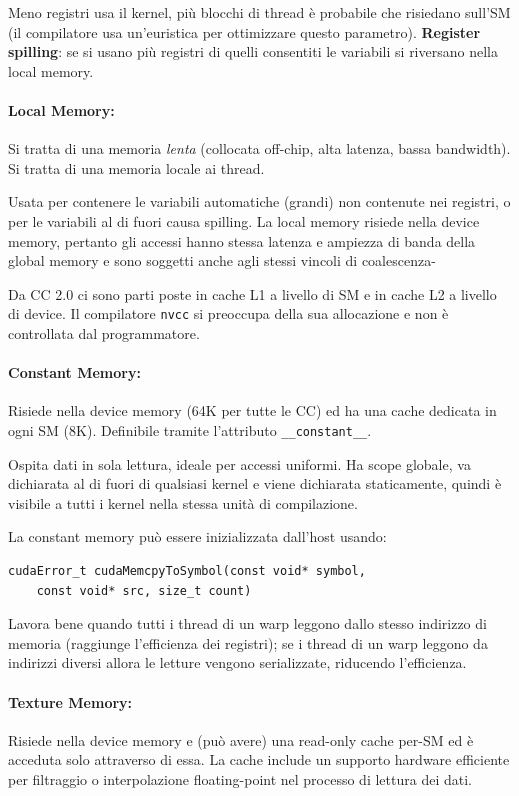 Meno registri usa il kernel, più blocchi di thread è probabile che risiedano sull'SM (il compilatore usa un'euristica per ottimizzare questo parametro). \textbf{Register spilling}: se si usano più registri di quelli consentiti le variabili si riversano nella local memory.

\paragraph{Local Memory:} Si tratta di una memoria \textit{lenta} (collocata off-chip, alta latenza, bassa bandwidth). Si tratta di una memoria locale ai thread.

Usata per contenere le variabili automatiche (grandi) non contenute nei registri, o per le variabili al di fuori causa spilling. La local memory risiede nella device memory, pertanto gli accessi hanno stessa latenza e ampiezza di banda della global memory e sono soggetti anche agli stessi vincoli di coalescenza-

Da CC 2.0 ci sono parti poste in cache L1 a livello di SM e in cache L2 a livello di device. Il compilatore \texttt{nvcc} si preoccupa della sua allocazione e non è controllata dal programmatore.

\paragraph{Constant Memory:} Risiede nella device memory (64K per tutte le CC) ed ha una cache dedicata in ogni SM (8K). Definibile tramite l'attributo \texttt{\_\_constant\_\_}. 

Ospita dati in sola lettura, ideale per accessi uniformi. Ha scope globale, va dichiarata al di fuori di qualsiasi kernel e viene dichiarata staticamente, quindi è visibile a tutti i kernel nella stessa unità di compilazione.

La constant memory può essere inizializzata dall'host usando:
\begin{verbatim}
cudaError_t cudaMemcpyToSymbol(const void* symbol,
    const void* src, size_t count)
\end{verbatim}

Lavora bene quando tutti i thread di un warp leggono dallo stesso indirizzo di memoria (raggiunge l'efficienza dei registri); se i thread di un warp leggono da indirizzi diversi allora le letture vengono serializzate, riducendo l'efficienza.

\paragraph{Texture Memory:} Risiede nella device memory e (può avere) una read-only cache per-SM ed è acceduta solo attraverso di essa. La cache include un supporto hardware efficiente per filtraggio o interpolazione floating-point nel processo di lettura dei dati. 

